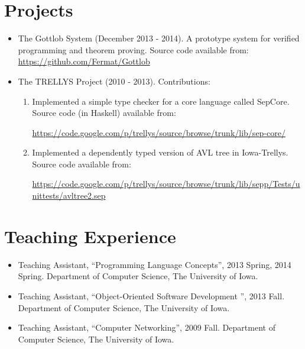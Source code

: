 \documentclass[11pt]{article}
\begin{document}
\section*{Projects}
\begin{itemize}
\item The Gottlob System (December 2013 - 2014). A prototype system for verified programming and theorem proving. Source code available from:  \url{https://github.com/Fermat/Gottlob}
\item The TRELLYS Project (2010 - 2013). Contributions: 
  \begin{enumerate}
  \item Implemented a simple type checker for a core language called SepCore. Source code (in Haskell) available from: 
    
    \noindent \url{https://code.google.com/p/trellys/source/browse/trunk/lib/sep-core/}
  \item Implemented a dependently typed version of AVL tree in Iowa-Trellys. Source code available from: 
    
    \noindent \url{https://code.google.com/p/trellys/source/browse/trunk/lib/sepp/Tests/unittests/avltree2.sep} 
  \end{enumerate}

\end{itemize}

\section*{Teaching Experience}

\begin{itemize}
\item Teaching Assistant,  ``Programming Language Concepts'', 2013 Spring, 2014 Spring. Department of Computer Science, The University of Iowa.
\item Teaching Assistant,  ``Object-Oriented Software Development '', 2013 Fall. Department of Computer Science, The University of Iowa.
  \item Teaching Assistant, ``Computer Networking'', 2009 Fall. Department of Computer Science, The University of Iowa.
\end{itemize}
\end{document}
